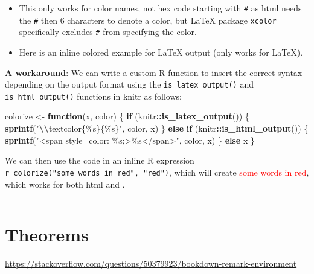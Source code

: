 \documentclass[
]{book}
\newenvironment{Shaded}{\begin{snugshade}}{\end{snugshade}}
\newcommand{\ControlFlowTok}[1]{\textcolor[rgb]{0.13,0.29,0.53}{\textbf{#1}}}
\newcommand{\FunctionTok}[1]{\textcolor[rgb]{0.13,0.29,0.53}{\textbf{#1}}}
\newcommand{\NormalTok}[1]{#1}
\newcommand{\OtherTok}[1]{\textcolor[rgb]{0.56,0.35,0.01}{#1}}
\newcommand{\SpecialCharTok}[1]{\textcolor[rgb]{0.81,0.36,0.00}{\textbf{#1}}}
\newcommand{\StringTok}[1]{\textcolor[rgb]{0.31,0.60,0.02}{#1}}
\theoremstyle{definition}
\theoremstyle{definition}
\theoremstyle{definition}
\theoremstyle{definition}
\theoremstyle{remark}
\begin{document}
\begin{itemize}
\item
  This only works for color names, not hex code starting with \texttt{\#} as html needs the \texttt{\#} then 6 characters to denote a color, but LaTeX package \texttt{xcolor} specifically excludes \texttt{\#} from specifying the color.
\item
  Here is an \textcolor[HTML]{00CC66}{inline colored example for LaTeX output} (only works for LaTeX).
\end{itemize}

\textbf{A workaround}: We can write a custom R function to insert the correct syntax depending on the output format using the \texttt{is\_latex\_output()} and \texttt{is\_html\_output()} functions in knitr as follows:

\begin{Shaded}
\begin{Highlighting}[]
\NormalTok{colorize }\OtherTok{\textless{}{-}} \ControlFlowTok{function}\NormalTok{(x, color) \{}
  \ControlFlowTok{if}\NormalTok{ (knitr}\SpecialCharTok{::}\FunctionTok{is\_latex\_output}\NormalTok{()) \{}
    \FunctionTok{sprintf}\NormalTok{(}\StringTok{"}\SpecialCharTok{\textbackslash{}\textbackslash{}}\StringTok{textcolor\{\%s\}\{\%s\}"}\NormalTok{, color, x)}
\NormalTok{  \} }\ControlFlowTok{else} \ControlFlowTok{if}\NormalTok{ (knitr}\SpecialCharTok{::}\FunctionTok{is\_html\_output}\NormalTok{()) \{}
    \FunctionTok{sprintf}\NormalTok{(}\StringTok{"\textless{}span style=\textquotesingle{}color: \%s;\textquotesingle{}\textgreater{}\%s\textless{}/span\textgreater{}"}\NormalTok{, color,}
\NormalTok{      x)}
\NormalTok{  \} }\ControlFlowTok{else}\NormalTok{ x}
\NormalTok{\}}
\end{Highlighting}
\end{Shaded}

We can then use the code in an inline R expression \texttt{\textasciigrave{}r\ colorize("some\ words\ in\ red",\ "red")\textasciigrave{}}, which will create \textcolor{red}{some words in red}, which works for both html and .

\begin{center}\rule{0.5\linewidth}{0.5pt}\end{center}

\section{Theorems}\label{theorems}

\url{https://stackoverflow.com/questions/50379923/bookdown-remark-environment}
\end{document}
